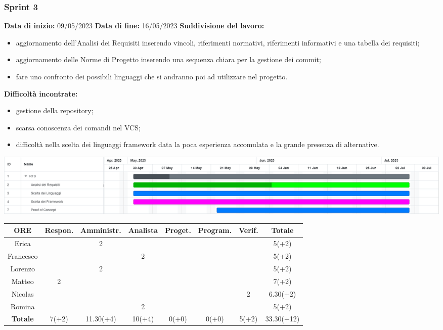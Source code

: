 \documentclass[a4paper, 12pt]{article}
\begin{document}
\subsubsection{Sprint 3}
\textbf{Data di inizio:} 09/05/2023\newline
\textbf{Data di fine:} 16/05/2023\newline
\newline
\textbf{Suddivisione del lavoro:}
\begin{itemize}
    \item aggiornamento dell'Analisi dei Requisiti inserendo vincoli, riferimenti normativi, riferimenti informativi e una tabella dei requisiti;
    \item aggiornamento delle Norme di Progetto inserendo una sequenza chiara per la gestione dei commit;
    \item fare uno confronto dei possibili linguaggi che si andranno poi ad utilizzare nel progetto.
\end{itemize}
\textbf{Difficoltà incontrate:}
\begin{itemize}
    \item gestione della repository;
    \item scarsa conoscenza dei comandi nel VCS;
    \item difficoltà nella scelta dei linguaggi framework data la poca esperienza accomulata e la grande presenza di alternative.
\end{itemize}
\includegraphics[scale=0.24]{RTB_2.png}\newline
\newline
\begin{tabular}{|c|c|c|c|c|c|c|c|}
    \hline
    \textbf{ORE} & \textbf{Respon.} & \textbf{Amministr.} & \textbf{Analista} & \textbf{Proget.} & \textbf{Program.} & \textbf{Verif.} & \textbf{Totale}\\
    \hline
    Erica & & 2 & & & & & 5(+2)\\
    \hline
    Francesco & & & 2 & & & & 5(+2)\\
    \hline
    Lorenzo & & 2 & & & & & 5(+2)\\
    \hline
    Matteo & 2 & & & & & & 7(+2)\\
    \hline
    Nicolas & & & & & & 2 & 6.30(+2)\\
    \hline
    Romina & & & 2 & & & & 5(+2)\\
    \hline
    \textbf{Totale} & 7(+2) & 11.30(+4) & 10(+4) & 0(+0) & 0(+0) & 5(+2) & 33.30(+12)\\
    \hline
\end{tabular}\\[8pt]
\end{document}
